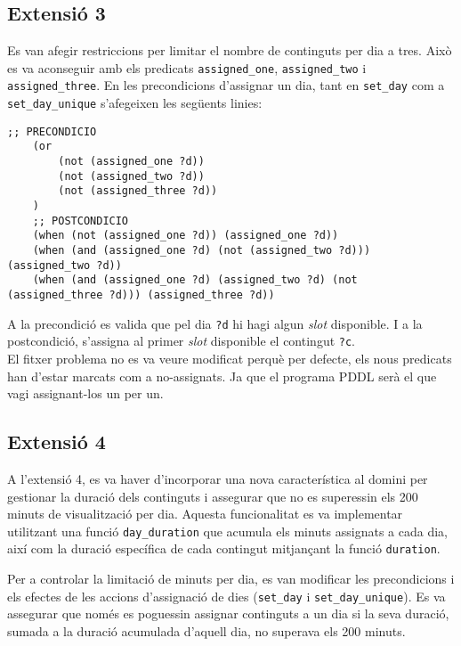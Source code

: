 \documentclass[a4paper]{article}
\begin{document}
	
	\subsection{Extensió 3}
	Es van afegir restriccions per limitar el nombre de continguts per dia a tres. Això es va aconseguir amb els predicats \texttt{assigned\_one}, \texttt{assigned\_two} i \texttt{assigned\_three}. En les precondicions d'assignar un dia, tant en \texttt{set\_day} com a \texttt{set\_day\_unique} s'afegeixen les següents linies: \\
	
	\begin{lstlisting}[language=PDDL, caption={Fragment per limitar a 3 els continguts per dia}, label={lst:extensio3}]
	;; PRECONDICIO	
	(or 
		(not (assigned_one ?d))
		(not (assigned_two ?d))
		(not (assigned_three ?d))
	)
	;; POSTCONDICIO
	(when (not (assigned_one ?d)) (assigned_one ?d))
	(when (and (assigned_one ?d) (not (assigned_two ?d))) (assigned_two ?d))
	(when (and (assigned_one ?d) (assigned_two ?d) (not (assigned_three ?d))) (assigned_three ?d))
	\end{lstlisting}
	
	A la precondició es valida que pel dia \texttt{?d} hi hagi algun \textit{slot} disponible. I a la postcondició, s'assigna al primer \textit{slot} disponible el contingut \texttt{?c}. \\
	
	El fitxer problema no es va veure modificat perquè per defecte, els nous predicats han d'estar marcats com a no-assignats. Ja que el programa PDDL serà el que vagi assignant-los un per un.

	\subsection{Extensió 4}
	
	A l'extensió 4, es va haver d'incorporar una nova característica al domini per gestionar la duració dels continguts i assegurar que no es superessin els 200 minuts de visualització per dia. Aquesta funcionalitat es va implementar utilitzant una funció \texttt{day\_duration} que acumula els minuts assignats a cada dia, així com la duració específica de cada contingut mitjançant la funció \texttt{duration}.
	
	Per a controlar la limitació de minuts per dia, es van modificar les precondicions i els efectes de les accions d'assignació de dies (\texttt{set\_day} i \texttt{set\_day\_unique}). Es va assegurar que només es poguessin assignar continguts a un dia si la seva duració, sumada a la duració acumulada d'aquell dia, no superava els 200 minuts.
	
\end{document}

